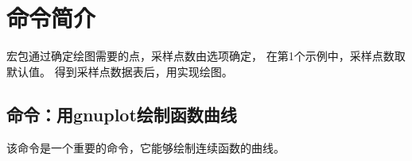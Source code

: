 \documentclass[../main.tex]{subfiles}
\begin{document}
\section{命令简介}

宏包通过确定绘图需要的点，采样点数由选项确定，
在第1个示例中，采样点数取默认值。
得到采样点数据表后，用\TIKZ{}实现绘图。

\subsection{命令：用gnuplot绘制函数曲线}
该命令是一个重要的命令，它能够绘制连续函数的曲线。\hypertarget{tfct}{}
\end{document}
